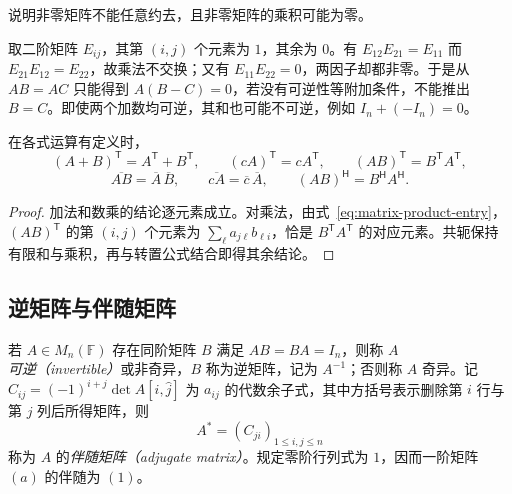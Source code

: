 \begin{example}
\label{ex:matrix-noncommutative}
说明非零矩阵不能任意约去，且非零矩阵的乘积可能为零。
\end{example}
\begin{solve}
取二阶矩阵 $E_{ij}$，其第 $(i,j)$ 个元素为 $1$，其余为 $0$。有 $E_{12}E_{21}=E_{11}$ 而 $E_{21}E_{12}=E_{22}$，故乘法不交换；又有 $E_{11}E_{22}=0$，两因子却都非零。于是从 $AB=AC$ 只能得到 $A(B-C)=0$，若没有可逆性等附加条件，不能推出 $B=C$。即使两个加数均可逆，其和也可能不可逆，例如 $I_n+(-I_n)=0$。
\end{solve}

\begin{proposition}
\label{prop:matrix-transpose}
在各式运算有定义时，
\[
 (A+B)^{\mathsf T}=A^{\mathsf T}+B^{\mathsf T},\qquad
 (cA)^{\mathsf T}=cA^{\mathsf T},\qquad
 (AB)^{\mathsf T}=B^{\mathsf T}A^{\mathsf T},
\]
\[
 \overline{AB}=\overline A\,\overline B,\qquad
 \overline{cA}=\overline c\,\overline A,\qquad
 (AB)^{\mathsf H}=B^{\mathsf H}A^{\mathsf H}.
\]
\end{proposition}
\begin{proof}
加法和数乘的结论逐元素成立。对乘法，由式~\eqref{eq:matrix-product-entry}，$(AB)^{\mathsf T}$ 的第 $(i,j)$ 个元素为 $\sum_\ell a_{j\ell}b_{\ell i}$，恰是 $B^{\mathsf T}A^{\mathsf T}$ 的对应元素。共轭保持有限和与乘积，再与转置公式结合即得其余结论。
\end{proof}

\subsection{逆矩阵与伴随矩阵}

\begin{definition}
\label{def:matrix-inverse-adjugate}
若 $A\in M_n(\mathbb F)$ 存在同阶矩阵 $B$ 满足 $AB=BA=I_n$，则称 $A$ \emph{可逆（invertible）}或非奇异，$B$ 称为逆矩阵，记为 $A^{-1}$；否则称 $A$ 奇异。记 $C_{ij}=(-1)^{i+j}\det A[\widehat i,\widehat j]$ 为 $a_{ij}$ 的代数余子式，其中方括号表示删除第 $i$ 行与第 $j$ 列后所得矩阵，则
\[
 A^*=(C_{ji})_{1\le i,j\le n}
\]
称为 $A$ 的\emph{伴随矩阵（adjugate matrix）}。规定零阶行列式为 $1$，因而一阶矩阵 $(a)$ 的伴随为 $(1)$。
\end{definition}

